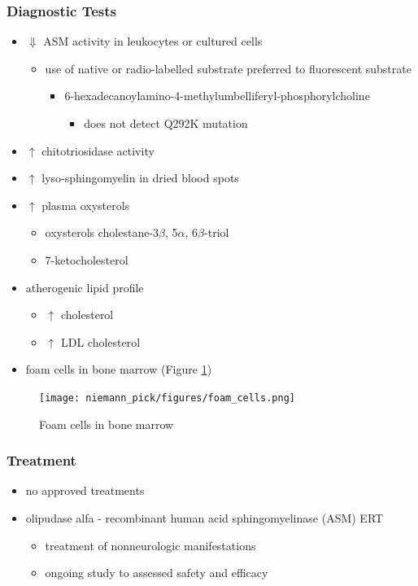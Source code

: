 \documentclass[12pt]{scrartcl}
\begin{document}
\subsubsection{Diagnostic Tests}
\label{sec:org159f8a6}
\begin{itemize}
\item \(\Downarrow\) ASM activity in leukocytes or cultured cells
\begin{itemize}
\item use of native or radio-labelled substrate preferred to fluorescent substrate
\begin{itemize}
\item 6-hexadecanoylamino-4-methylumbelliferyl-phosphorylcholine
\begin{itemize}
\item does not detect Q292K mutation
\end{itemize}
\end{itemize}
\end{itemize}
\item \(\uparrow\) chitotriosidase activity
\item \(\uparrow\) lyso-sphingomyelin in dried blood spots
\item \(\uparrow\) plasma oxysterols
\begin{itemize}
\item oxysterols cholestane-3\(\beta\), 5\(\alpha\), 6\(\beta\)-triol
\item 7-ketocholesterol
\end{itemize}
\item atherogenic lipid profile 
\begin{itemize}
\item \(\uparrow\) cholesterol
\item \(\uparrow\) LDL cholesterol
\end{itemize}
\item foam cells in bone marrow (Figure \ref{fig:org339e927})
\end{itemize}

\begin{figure}[htbp]
\centering
\texttt{[image: niemann\_pick/figures/foam\_cells.png]}
\caption{\label{fig:org339e927}Foam cells in bone marrow}
\end{figure}

\subsubsection{Treatment}
\label{sec:orgb481cad}
\begin{itemize}
\item no approved treatments
\item olipudase alfa - recombinant human acid sphingomyelinase (ASM) ERT
\begin{itemize}
\item treatment of nonneurologic manifestations
\item ongoing study to assessed safety and efficacy
\end{itemize}
\end{itemize}
\end{document}
